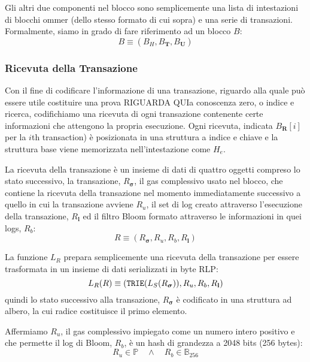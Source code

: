 \documentclass[9pt,oneside]{amsart}
\begin{document}
\begin{multicols}{2}
Gli altri due componenti nel blocco sono semplicemente una lista di intestazioni di blocchi ommer (dello stesso formato di cui sopra) e una serie di transazioni. Formalmente, siamo in grado di fare riferimento ad un blocco $B$:
\begin{equation}
B \equiv (B_H, B_\mathbf{T}, B_\mathbf{U})
\end{equation}

\subsubsection{Ricevuta della Transazione}

Con il fine di codificare l'informazione di una transazione, riguardo alla quale può essere utile costituire una prova RIGUARDA QUIa conoscenza zero, o indice e ricerca, codifichiamo una ricevuta di ogni transazione contenente certe informazioni che attengono la propria esecuzione. Ogni ricevuta, indicata $B_\mathbf{R}[i]$ per la $i$th transaction) è posizionata in una struttura a indice e chiave e la struttura base viene memorizzata nell'intestazione come $H_e$.

La ricevuta della transazione è un insieme di dati di quattro oggetti compreso lo stato successivo, la transazione, $R_{\boldsymbol{\sigma}}$, il gas complessivo usato nel blocco, che contiene la ricevuta della transazione nel momento immediatamente successivo a quello in cui la transazione avviene $R_u$, il set di log creato attraverso l'esecuzione della transazione, $R_\mathbf{l}$ ed il filtro Bloom formato attraverso le informazioni in quei logs, $R_b$:
\begin{equation}
R \equiv (R_{\boldsymbol{\sigma}}, R_u, R_b, R_\mathbf{l})
\end{equation}

La funzione $L_R$ prepara semplicemente una ricevuta della transazione per essere trasformata in un insieme di dati serializzati in byte RLP:
\begin{equation}
L_R(R) \equiv (\mathtt{\small TRIE}(L_S(R_{\boldsymbol{\sigma}})), R_u, R_b, R_\mathbf{l})
\end{equation}
quindi lo stato successivo alla transazione, $R_{\boldsymbol{\sigma}}$ è codificato in una struttura ad albero, la cui radice costituisce il primo elemento.

Affermiamo $R_u$, il gas complessivo impiegato come un numero intero positivo e che permette il log di Bloom, $R_b$, è un hash di grandezza a 2048 bits (256 bytes):
\begin{equation}
R_u \in \mathbb{P} \quad \wedge \quad R_b \in \mathbb{B}_{256}
\end{equation}


\end{multicols}
\end{document}
